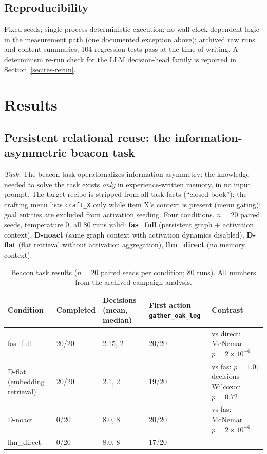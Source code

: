 \documentclass[10pt,a4paper]{article}
\begin{document}
\subsection{Reproducibility}
Fixed seeds; single-process deterministic execution; no wall-clock-dependent logic in the measurement path (one documented exception above); archived raw runs and content summaries; 104 regression tests pass at the time of writing. A determinism re-run check for the LLM decision-head family is reported in Section~\ref{sec:res-rerun}.

\section{Results}
\label{sec:results}

\subsection{Persistent relational reuse: the information-asymmetric beacon task}
\label{sec:res-reuse}

\emph{Task.} The beacon task operationalizes information asymmetry: the knowledge needed to solve the task exists \emph{only} in experience-written memory, in no input prompt. The target recipe is stripped from all task facts (``closed book''); the crafting menu lists \texttt{craft\_X} only while item X's context is present (menu gating); goal entities are excluded from activation seeding. Four conditions, $n{=}20$ paired seeds, temperature 0, all 80 runs valid: \textbf{fas\_full} (persistent graph + activation context), \textbf{D-noact} (same graph context with activation dynamics disabled), \textbf{D-flat} (flat retrieval without activation aggregation), \textbf{llm\_direct} (no memory context).

\begin{table}[t]
\centering\small
\caption{Beacon task results ($n{=}20$ paired seeds per condition; 80 runs). All numbers from the archived campaign analysis.}
\label{tab:beacon}
\begin{tabular}{L{2.6cm}L{2.2cm}L{3.4cm}L{3.4cm}L{2.6cm}}
\toprule
\textbf{Condition} & \textbf{Completed} & \textbf{Decisions (mean, median)} & \textbf{First action \texttt{gather\_oak\_log}} & \textbf{Contrast} \\
\midrule
fas\_full & 20/20 & 2.15, 2 & 20/20 & vs direct: McNemar $p{=}2\times10^{-6}$ \\
D-flat (embedding retrieval) & 20/20 & 2.1, 2 & 19/20 & vs fas: $p{=}1.0$; decisions Wilcoxon $p{=}0.72$ \\
D-noact & 0/20 & 8.0, 8 & 20/20 & vs fas: McNemar $p{=}2\times10^{-6}$ \\
llm\_direct & 0/20 & 8.0, 8 & 17/20 & --- \\
\bottomrule
\end{tabular}
\end{table}
\end{document}
